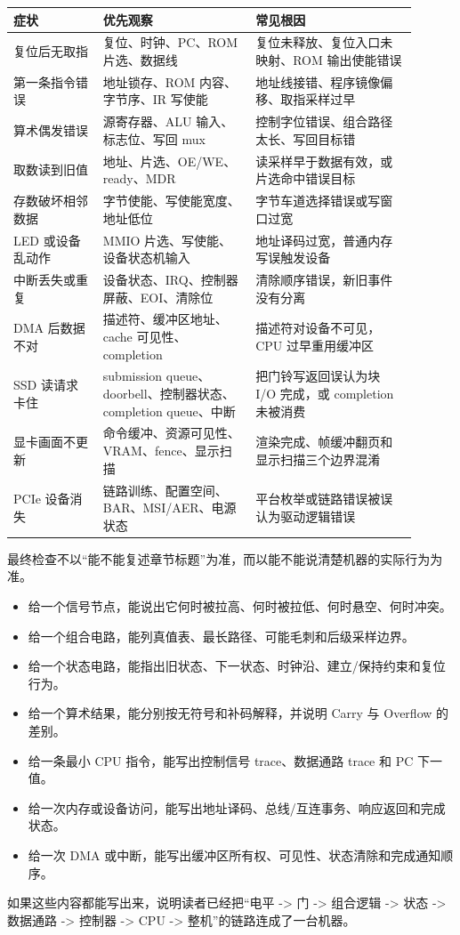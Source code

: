 \begin{longtable}{L{0.2\linewidth}L{0.34\linewidth}L{0.36\linewidth}}
\toprule
症状 & 优先观察 & 常见根因 \\
\midrule
复位后无取指 & 复位、时钟、PC、ROM 片选、数据线 & 复位未释放、复位入口未映射、ROM 输出使能错误 \\\tablerowrule
第一条指令错误 & 地址锁存、ROM 内容、字节序、IR 写使能 & 地址线接错、程序镜像偏移、取指采样过早 \\\tablerowrule
算术偶发错误 & 源寄存器、ALU 输入、标志位、写回 mux & 控制字位错误、组合路径太长、写回目标错 \\\tablerowrule
取数读到旧值 & 地址、片选、OE/WE、ready、MDR & 读采样早于数据有效，或片选命中错误目标 \\\tablerowrule
存数破坏相邻数据 & 字节使能、写使能宽度、地址低位 & 字节车道选择错误或写窗口过宽 \\\tablerowrule
LED 或设备乱动作 & MMIO 片选、写使能、设备状态机输入 & 地址译码过宽，普通内存写误触发设备 \\\tablerowrule
中断丢失或重复 & 设备状态、IRQ、控制器屏蔽、EOI、清除位 & 清除顺序错误，新旧事件没有分离 \\\tablerowrule
DMA 后数据不对 & 描述符、缓冲区地址、cache 可见性、completion & 描述符对设备不可见，CPU 过早重用缓冲区 \\\tablerowrule
SSD 读请求卡住 & submission queue、doorbell、控制器状态、completion queue、中断 & 把门铃写返回误认为块 I/O 完成，或 completion 未被消费 \\\tablerowrule
显卡画面不更新 & 命令缓冲、资源可见性、VRAM、fence、显示扫描 & 渲染完成、帧缓冲翻页和显示扫描三个边界混淆 \\\tablerowrule
PCIe 设备消失 & 链路训练、配置空间、BAR、MSI/AER、电源状态 & 平台枚举或链路错误被误认为驱动逻辑错误 \\
\bottomrule
\end{longtable}

\begin{classicnote}
最终检查不以“能不能复述章节标题”为准，而以能不能说清楚机器的实际行为为准。

\begin{itemize}
\item 给一个信号节点，能说出它何时被拉高、何时被拉低、何时悬空、何时冲突。
\item 给一个组合电路，能列真值表、最长路径、可能毛刺和后级采样边界。
\item 给一个状态电路，能指出旧状态、下一状态、时钟沿、建立/保持约束和复位行为。
\item 给一个算术结果，能分别按无符号和补码解释，并说明 Carry 与 Overflow 的差别。
\item 给一条最小 CPU 指令，能写出控制信号 trace、数据通路 trace 和 PC 下一值。
\item 给一次内存或设备访问，能写出地址译码、总线/互连事务、响应返回和完成状态。
\item 给一次 DMA 或中断，能写出缓冲区所有权、可见性、状态清除和完成通知顺序。
\end{itemize}

如果这些内容都能写出来，说明读者已经把“电平 -> 门 -> 组合逻辑 -> 状态 -> 数据通路 -> 控制器 -> CPU -> 整机”的链路连成了一台机器。
\end{classicnote}
